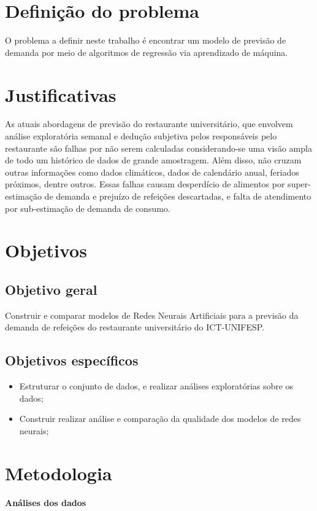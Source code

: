 \documentclass[	12pt, Times, openright, twoside, a4paper, english, brazil]{abntex2}
\begin{document}
      \section{Definição do problema}
        O problema a definir neste trabalho é encontrar um modelo de previsão de demanda por meio de algoritmos de regressão via aprendizado de máquina.

      \section{Justificativas}
        As atuais abordagens de previsão do restaurante universitário, que envolvem análise exploratória semanal e dedução subjetiva pelos responsáveis pelo restaurante são falhas por não serem calculadas considerando-se uma visão ampla de todo um histórico de dados de grande amostragem. Além disso, não cruzam outras informações como dados climáticos, dados de calendário anual, feriados próximos, dentre outros. Essas falhas causam desperdício de alimentos por super-estimação de demanda e prejuízo de refeições descartadas, e falta de atendimento por sub-estimação de demanda de consumo.

      \section{Objetivos}
        \subsection{Objetivo geral}
          Construir e comparar modelos de Redes Neurais Artificiais para a previsão da demanda de
          refeições do restaurante universitário do ICT-UNIFESP.
        
        \subsection{Objetivos específicos}
          \begin{itemize}
          \item Estruturar o conjunto de dados, e realizar análises exploratórias sobre os dados; 
          \item Construir realizar análise e comparação da qualidade dos modelos de redes neurais; %
          \end{itemize}
      \section{Metodologia}
        \textbf{Análises dos dados}
\end{document}

